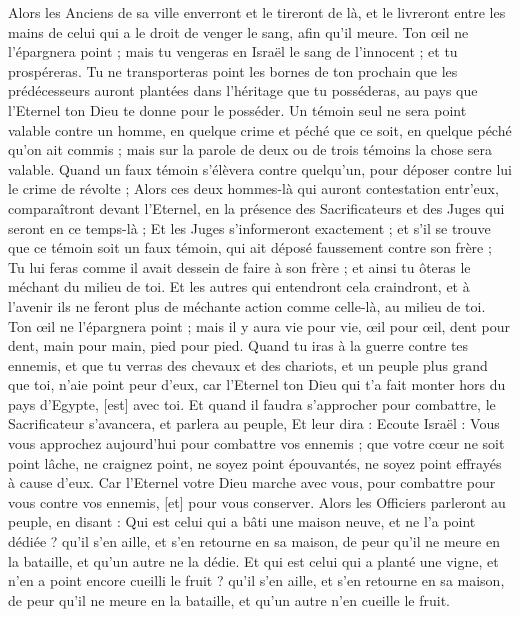 \begin{multicols}{2}
Alors les Anciens de sa ville enverront et le tireront de là, et le livreront entre les mains de celui qui a le droit de venger le sang, afin qu'il meure.
Ton œil ne l'épargnera point ; mais tu vengeras en Israël le sang de l'innocent ; et tu prospéreras.
Tu ne transporteras point les bornes de ton prochain que les prédécesseurs auront plantées dans l'héritage que tu posséderas, au pays que l'Eternel ton Dieu te donne pour le posséder.
Un témoin seul ne sera point valable contre un homme, en quelque crime et péché que ce soit, en quelque péché qu'on ait commis ; mais sur la parole de deux ou de trois témoins la chose sera valable.
Quand un faux témoin s'élèvera contre quelqu'un, pour déposer contre lui le crime de révolte ;
Alors ces deux hommes-là qui auront contestation entr'eux, comparaîtront devant l'Eternel, en la présence des Sacrificateurs et des Juges qui seront en ce temps-là ;
Et les Juges s'informeront exactement ; et s'il se trouve que ce témoin soit un faux témoin, qui ait déposé faussement contre son frère ;
Tu lui feras comme il avait dessein de faire à son frère ; et ainsi tu ôteras le méchant du milieu de toi.
Et les autres qui entendront cela craindront, et à l'avenir ils ne feront plus de méchante action comme celle-là, au milieu de toi.
Ton œil ne l'épargnera point ; mais il y aura vie pour vie, œil pour œil, dent pour dent, main pour main, pied pour pied.
\VerseOne{}Quand tu iras à la guerre contre tes ennemis, et que tu verras des chevaux et des chariots, et un peuple plus grand que toi, n'aie point peur d'eux, car l'Eternel ton Dieu qui t'a fait monter hors du pays d'Egypte, [est] avec toi.
Et quand il faudra s'approcher pour combattre, le Sacrificateur s'avancera, et parlera au peuple,
Et leur dira : Ecoute Israël : Vous vous approchez aujourd'hui pour combattre vos ennemis ; que votre cœur ne soit point lâche, ne craignez point, ne soyez point épouvantés, ne soyez point effrayés à cause d'eux.
Car l'Eternel votre Dieu marche avec vous, pour combattre pour vous contre vos ennemis, [et] pour vous conserver.
Alors les Officiers parleront au peuple, en disant : Qui est celui qui a bâti une maison neuve, et ne l'a point dédiée ? qu'il s'en aille, et s'en retourne en sa maison, de peur qu'il ne meure en la bataille, et qu'un autre ne la dédie.
Et qui est celui qui a planté une vigne, et n'en a point encore cueilli le fruit ? qu'il s'en aille, et s'en retourne en sa maison, de peur qu'il ne meure en la bataille, et qu'un autre n'en cueille le fruit.

\end{multicols}
